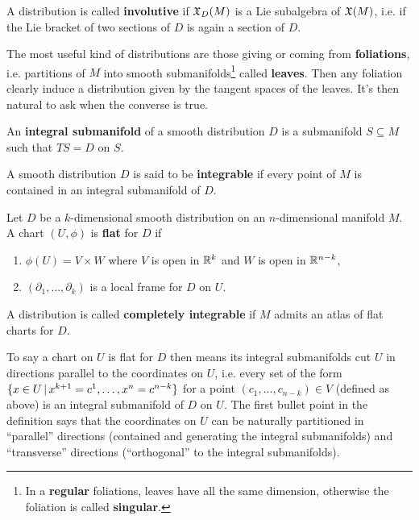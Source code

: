 \documentclass[main.tex]{subfiles}
\begin{document}
\begin{definition}
	A distribution is called \textbf{involutive} if $\mathfrak{X}_D(M)$ is a Lie subalgebra of $\mathfrak{X}(M)$, i.e. if the Lie bracket of two sections of $D$ is again a section of $D$.
\end{definition}

The most useful kind of distributions are those giving or coming from \textbf{foliations}, i.e. partitions of $M$ into smooth submanifolds\footnote{In a \textbf{regular} foliations, leaves have all the same dimension, otherwise the foliation is called \textbf{singular}.} called \textbf{leaves}. Then any foliation clearly induce a distribution given by the tangent spaces of the leaves. It's then natural to ask when the converse is true.

\begin{definition}
	An \textbf{integral submanifold} of a smooth distribution $D$ is a submanifold $S \subseteq M$ such that $TS = D$ on $S$.
\end{definition}

\begin{definition}
	A smooth distribution $D$ is said to be \textbf{integrable} if every point of $M$ is contained in an integral submanifold of $D$.
\end{definition}

\begin{definition}
	Let $D$ be a $k$-dimensional smooth distribution on an $n$-dimensional manifold $M$. A chart $(U,\phi)$ is \textbf{flat} for $D$ if
	\begin{enumerate}
		\item $\phi(U) = V \times W$ where $V$ is open in $\mathbb{R}^k$ and $W$ is open in $\mathbb{R}^{n-k}$,
		\item $(\partial_1, \ldots, \partial_k)$ is a local frame for $D$ on $U$.
	\end{enumerate}
	A distribution is called \textbf{completely integrable} if $M$ admits an atlas of flat charts for $D$.
\end{definition}

To say a chart on $U$ is flat for $D$ then means its integral submanifolds cut $U$ in directions parallel to the coordinates on $U$, i.e. every set of the form $\{x \in U \,|\, x^{k+1} = c^1, \ldots, x^n=c^{n-k}\}$ for a point $(c_1, \ldots, c_{n-k}) \in V$ (defined as above) is an integral submanifold of $D$ on $U$. The first bullet point in the definition says that the coordinates on $U$ can be naturally partitioned in ``parallel'' directions (contained and generating the integral submanifolds) and ``transverse'' directions (``orthogonal'' to the integral submanifolds).
\end{document}
